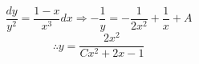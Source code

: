 \item

\[
	\frac{dy}{y^2} = \frac{1 - x}{x^3}dx
	\Rightarrow -\frac{1}{y} = -\frac{1}{2x^2} + \frac{1}{x} + A
\]
\[
	\therefore y = \frac{2x^2}{Cx^2 + 2x - 1}
\]